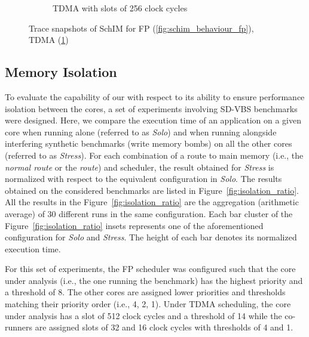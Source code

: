 \begin{figure}[t]
\begin{subfigure}{0.45\textwidth}
        \caption{TDMA with slots of 256 clock cycles}
        \label{fig:schim_behaviour_tdma}
      \end{subfigure}
      \hfill
      \begin{subfigure}{0.45\textwidth}
      \end{subfigure}
      \caption{Trace snapshots of SchIM for FP (\ref{fig:schim_behaviour_fp}), TDMA (\ref{fig:schim_behaviour_tdma}) }
      \label{fig:schim_behaviour}
    \end{figure}

\subsection{Memory Isolation}
\label{subsec:isolation}
To evaluate the capability of our \schim with respect to its ability to
ensure performance isolation between the cores, a set of experiments
involving SD-VBS benchmarks were designed. Here, we compare the
execution time of an application on a given core when running alone
(referred to as \emph{Solo}) and when running alongside interfering synthetic
benchmarks (write memory bombs) on all the other cores (referred to as
\emph{Stress}).
For each combination of a route to main memory (i.e., the \emph{normal
route} or the \emph{\schim route}) and scheduler, the result obtained
for \emph{Stress} is normalized with respect to the equivalent configuration
in \emph{Solo}.
The results obtained on the considered benchmarks are listed in
Figure~\ref{fig:isolation_ratio}. All the results in the
Figure~\ref{fig:isolation_ratio} are the aggregation (arithmetic average)
of 30 different runs in the same configuration. Each bar cluster of the Figure~\ref{fig:isolation_ratio} insets represents one of the aforementioned configuration for \emph{Solo} and \emph{Stress}. The height of each bar denotes its normalized execution time.

For this set of experiments, the FP scheduler was configured such that the core under
analysis (i.e., the one running the benchmark) has the highest priority
and a threshold of 8. The other cores are assigned lower priorities and
thresholds matching their priority order (i.e., 4, 2, 1). Under TDMA scheduling, the core under analysis has a slot of 512 clock cycles and a threshold of 14 while the co-runners are assigned slots of 32 and 16 clock cycles with thresholds of 4 and 1.

